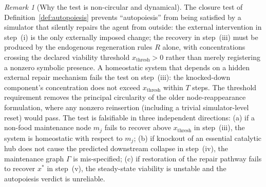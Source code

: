 \documentclass[11pt,a4paper]{article}
\theoremstyle{plain}
\theoremstyle{definition}
\theoremstyle{remark}
\newtheorem{remark}[theorem]{Remark}
\begin{document}
\begin{remark}[Why the test is non-circular and dynamical]
The closure test of Definition~\ref{def:autopoiesis} prevents
``autopoiesis'' from being satisfied by a simulator that silently
repairs the agent from outside: the external intervention in step~(i)
is the only externally imposed change; the recovery in step~(iii) must
be produced by the endogenous regeneration rules $R$ alone, with
concentrations crossing the declared viability threshold
$x_{\mathrm{thresh}} > 0$ rather than merely registering a nonzero
symbolic presence. A homeostatic system that depends on a hidden
external repair mechanism fails the test on step~(iii): the knocked-down
component's concentration does not exceed $x_{\mathrm{thresh}}$ within
$T$ steps. The threshold requirement removes the principal circularity
of the older node-reappearance formulation, where any nonzero
reinsertion (including a trivial simulator-level reset) would pass.
The test is falsifiable in three independent directions: (a) if a
non-food maintenance node $m_j$ fails to recover above
$x_{\mathrm{thresh}}$ in step~(iii), the system is homeostatic with
respect to $m_j$; (b) if knockout of an essential catalytic hub does
not cause the predicted downstream collapse in step~(iv), the
maintenance graph $\Gamma$ is mis-specified; (c) if restoration of
the repair pathway fails to recover $x^*$ in step~(v), the
steady-state viability is unstable and the autopoiesis verdict is
unreliable.
\end{remark}
\end{document}
